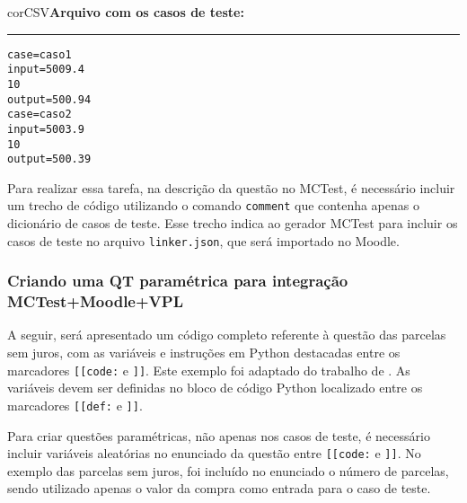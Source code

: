 \begin{myboxCode}{corCSV}{\textbf{Arquivo com os casos de teste:}}\vspace{3mm}
\hrule
\begin{verbatim}
case=caso1
input=5009.4
10
output=500.94
case=caso2
input=5003.9
10
output=500.39
\end{verbatim}
\end{myboxCode}

Para realizar essa tarefa, na descrição da questão no MCTest, é necessário incluir um trecho de código utilizando o comando \verb|comment| que contenha apenas o dicionário de casos de teste. Esse trecho indica ao gerador MCTest para incluir os casos de teste no arquivo \verb|linker.json|, que será importado no Moodle.


\subsubsection{Criando uma QT paramétrica para integração MCTest+Moodle+VPL}

A seguir, será apresentado um código completo referente à questão das parcelas sem juros, com as variáveis e instruções em Python destacadas entre os marcadores \verb|[[code:| e \verb|]]|. Este exemplo foi adaptado do trabalho de . As variáveis devem ser definidas no bloco de código Python localizado entre os marcadores \verb|[[def:| e \verb|]]|.

Para criar questões paramétricas, não apenas nos casos de teste, é necessário incluir variáveis aleatórias no enunciado da questão entre \verb|[[code:| e \verb|]]|. No exemplo das parcelas sem juros, foi incluído no enunciado o número de parcelas, sendo utilizado apenas o valor da compra como entrada para o caso de teste.


